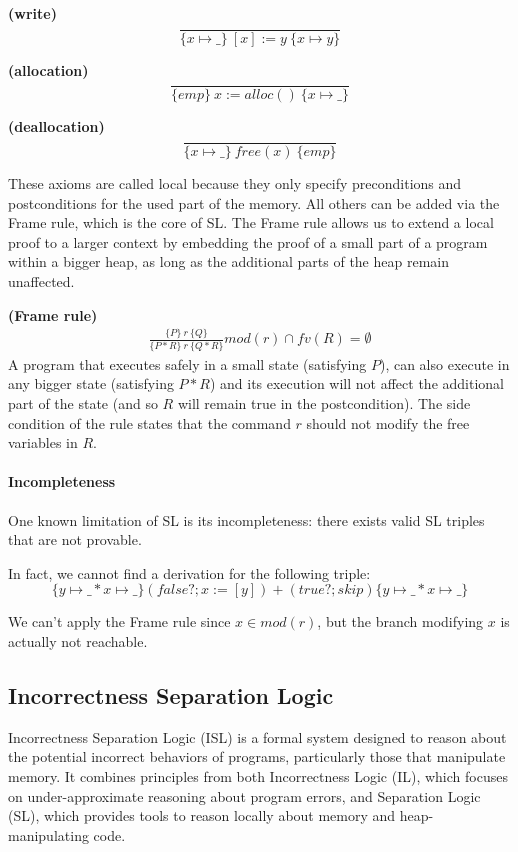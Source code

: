 \documentclass[parskip=half]{scrartcl}
\begin{document}
\textbf{(write)} 
\[
\frac{}{\{x\mapsto \_\}\ [x]:=y\ \{x\mapsto y\}}
\]

\textbf{(allocation)} 
\[
\frac{}{\{emp\}\ x:=alloc()\ \{x\mapsto \_\}}
\]

\textbf{(deallocation)} 
\[
\frac{}{\{x\mapsto \_\}\ free(x)\ \{emp\}}
\]

These axioms are called local because they only specify preconditions and postconditions for the used part of the memory. All others can be added via the Frame rule, which is the core of SL. The Frame rule allows us to extend a local proof to a larger context by embedding the proof of a small part of a program within a bigger heap, as long as the additional parts of the heap remain unaffected.

\textbf{(Frame rule)} 
\begin{align*}
    \frac{\{P\}\ r\ \{Q\}}{\{P\ast R\}\ r\ \{Q\ast R\}}mod(r)\cap fv(R)=\emptyset
\end{align*}
A program that executes safely in a small state (satisfying \(P\)), can also execute in any bigger state (satisfying \(P\ast R\)) and its execution will not affect the additional part of the state (and so \(R\) will remain true in the postcondition).
The side condition of the rule states that the command \(r\) should not modify the free variables in \(R\).

\paragraph{Incompleteness}
One known limitation of SL is its incompleteness: there exists valid SL triples that are not provable.

In fact, we cannot find a derivation for the following triple:
\[
\{y\mapsto\_\ast x\mapsto\_\}(false?;x:=[y])+(true?;skip)\{y\mapsto\_\ast x\mapsto\_\}
\]

We can't apply the Frame rule since $x\in mod(r)$, but the branch modifying $x$ is actually not reachable.

\subsection{Incorrectness Separation Logic} \label{ISL}
Incorrectness Separation Logic (ISL) is a formal system designed to reason about the potential incorrect behaviors of programs, particularly those that manipulate memory. It combines principles from both Incorrectness Logic (IL), which focuses on under-approximate reasoning about program errors, and Separation Logic (SL), which provides tools to reason locally about memory and heap-manipulating code.
\end{document}
